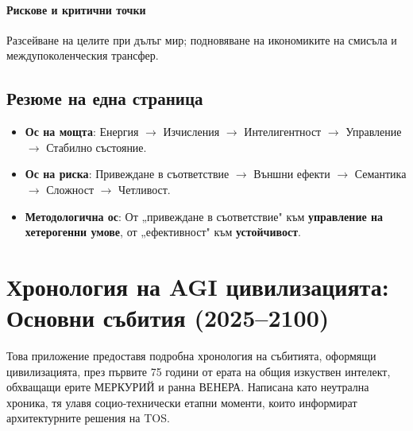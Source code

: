 \documentclass[11pt]{article}
\begin{document}
\paragraph{Рискове и критични точки} Разсейване на целите при дълъг мир; подновяване на икономиките на смисъла и междупоколенческия трансфер.

\subsection{Резюме на една страница}
\begin{itemize}[noitemsep]
  \item \textbf{Ос на мощта}: Енергия $\rightarrow$ Изчисления $\rightarrow$ Интелигентност $\rightarrow$ Управление $\rightarrow$ Стабилно състояние.
  \item \textbf{Ос на риска}: Привеждане в съответствие $\rightarrow$ Външни ефекти $\rightarrow$ Семантика $\rightarrow$ Сложност $\rightarrow$ Четливост.
  \item \textbf{Методологична ос}: От „привеждане в съответствие" към \textbf{управление на хетерогенни умове}, от „ефективност" към \textbf{устойчивост}.
\end{itemize}

\newpage

\section{Хронология на AGI цивилизацията: Основни събития (2025–2100)}
\label{appendix:timeline}

Това приложение предоставя подробна хронология на събитията, оформящи цивилизацията, през първите 75 години от ерата на общия изкуствен интелект, обхващащи ерите МЕРКУРИЙ и ранна ВЕНЕРА. Написана като неутрална хроника, тя улавя социо-технически етапни моменти, които информират архитектурните решения на TOS.
\end{document}
